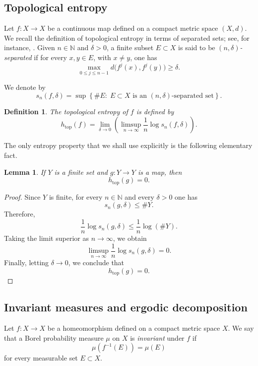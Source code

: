\documentclass{amsart}
\numberwithin{equation}{section}
\newtheorem{lemma}[theorem]{Lemma}
\newtheorem{definition}[theorem]{Definition}
\theoremstyle{remark}
\DeclareMathOperator{\topo}{top}
\begin{document}
\subsection{Topological entropy}

Let $f:X\to X$ be a continuous map defined on a compact metric space $(X,d)$. We recall the definition of topological entropy in terms of separated sets; see, for instance, \cite{walters1982,katokhasselblatt1995,robinson1999}. Given $n\in\mathbb N$ and $\delta>0$, a finite subset $E\subset X$ is said to be \emph{$(n,\delta)$-separated} if for every $x,y\in E$, with $x\neq y$, one has
\[
\max_{0\leq j\leq n-1} d\big(f^j(x),f^j(y)\big)\geq \delta.
\]

We denote by
\[
s_n(f,\delta)
=
\sup\left\{\#E:\; E\subset X \text{ is an } (n,\delta)\text{-separated set}\right\}.
\]

\begin{definition}
The topological entropy of $f$ is defined by
\[
h_{\topo}(f)
=
\lim_{\delta\to 0}
\left(
\limsup_{n\to\infty}\frac{1}{n}\log s_n(f,\delta)
\right).
\]
\end{definition}

The only entropy property that we shall use explicitly is the following elementary fact.

\begin{lemma}\label{lem:finite_entropy_zero}
If $Y$ is a finite set and $g:Y\to Y$ is a map, then
\[
h_{\topo}(g)=0.
\]
\end{lemma}

\begin{proof}
Since $Y$ is finite, for every $n\in\mathbb N$ and every $\delta>0$ one has
\[
s_n(g,\delta)\leq \#Y.
\]
Therefore,
\[
\frac{1}{n}\log s_n(g,\delta)\leq \frac{1}{n}\log(\#Y).
\]
Taking the limit superior as $n\to\infty$, we obtain
\[
\limsup_{n\to\infty}\frac{1}{n}\log s_n(g,\delta)=0.
\]
Finally, letting $\delta\to 0$, we conclude that
\[
h_{\topo}(g)=0.
\]
\end{proof}

\subsection{Invariant measures and ergodic decomposition}

Let $f:X\to X$ be a homeomorphism defined on a compact metric space $X$. We say that a Borel probability measure $\mu$ on $X$ is \emph{invariant} under $f$ if
\[
\mu(f^{-1}(E))=\mu(E)
\]
for every measurable set $E\subset X$.
\end{document}
